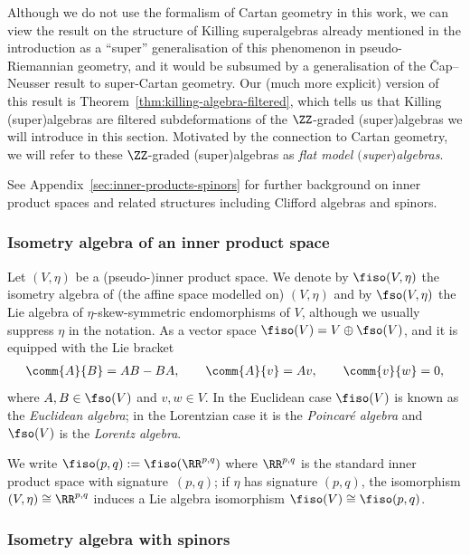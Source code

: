 Although we do not use the formalism of Cartan geometry in this work, we can view the result on the structure of Killing superalgebras already mentioned in the introduction as a ``super'' generalisation of this phenomenon in pseudo-Riemannian geometry, and it would be subsumed by a generalisation of the \v{C}ap--Neusser result \cite{Cap2009} to super-Cartan geometry. Our (much more explicit) version of this result is Theorem~\ref{thm:killing-algebra-filtered}, which tells us that Killing (super)algebras are filtered subdeformations of the $\ZZ$-graded (super)algebras we will introduce in this section. Motivated by the connection to Cartan geometry, we will refer to these $\ZZ$-graded (super)algebras as \emph{flat model $($super$)$algebras}.

See Appendix~\ref{sec:inner-products-spinors} for further background on inner product spaces and related structures including Clifford algebras and spinors.

\subsubsection{Isometry algebra of an inner product space}

Let $(V,\eta)$ be a (pseudo-)inner product space. We denote by $\fiso(V,\eta)$ the isometry algebra of (the affine space modelled on) $(V,\eta)$ and by $\fso(V,\eta)$ the Lie algebra of $\eta$-skew-symmetric endomorphisms of $V$, although we usually suppress $\eta$ in the notation. As a vector space $\fiso(V)=V\oplus\fso(V)$, and it is equipped with the Lie bracket
\begin{align}\label{eq:flat-bracket}
 \comm{A}{B} = AB - BA,\qquad
 \comm{A}{v} = Av,\qquad
\comm{v}{w} = 0,
\end{align}
where $A,B\in\fso(V)$ and $v,w\in V$. In the Euclidean case $\fiso(V)$ is known as the \emph{Euclidean algebra}; in the Lorentzian case it is the \emph{Poincar\'e algebra} and $\fso(V)$ is the \emph{Lorentz algebra}.

We write $\fiso(p,q):=\fiso(\RR^{p,q})$ where $\RR^{p,q}$ is the standard inner product space with signature~$(p,q)$; if $\eta$ has signature $(p,q)$, the isomorphism $(V,\eta)\cong\RR^{p,q}$ induces a Lie algebra isomorphism $\fiso(V)\cong\fiso(p,q)$.

\subsubsection{Isometry algebra with spinors}
\label{sec:isom-alg-spinors}

